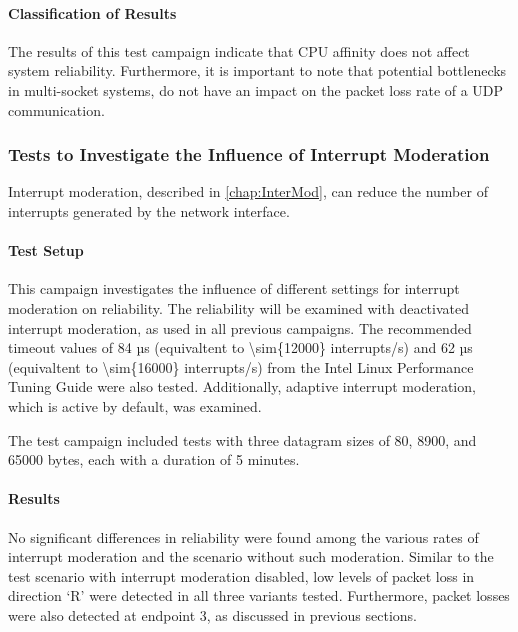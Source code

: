 \paragraph{Classification of Results}
The results of this test campaign indicate that CPU affinity does not affect system reliability. Furthermore, it is important to note that potential bottlenecks in multi-socket systems, do not have an impact on the packet loss rate of a UDP communication.


\subsubsection{Tests to Investigate the Influence of Interrupt Moderation} \label{chap:RelInterMod}
Interrupt moderation, described in \ref{chap:InterMod}, can reduce the number of interrupts generated by the network interface.

\paragraph{Test Setup}
This campaign investigates the influence of different settings for interrupt moderation on reliability. The reliability will be examined with deactivated interrupt moderation, as used in all previous campaigns. The recommended timeout values of 84 µs (equivaltent to \num{\sim{12000}} interrupts/s) and 62 µs (equivaltent to \num{\sim{16000}} interrupts/s) from the Intel Linux Performance Tuning Guide \cite{intermod03} were also tested. Additionally, adaptive interrupt moderation, which is active by default, was examined.  

The test campaign included tests with three datagram sizes of 80, 8900, and 65000 bytes, each with a duration of 5 minutes.

\paragraph{Results}
No significant differences in reliability were found among the various rates of interrupt moderation and the scenario without such moderation. Similar to the test scenario with interrupt moderation disabled, low levels of packet loss in direction `R' were detected in all three variants tested. Furthermore, packet losses were also detected at endpoint 3, as discussed in previous sections.

